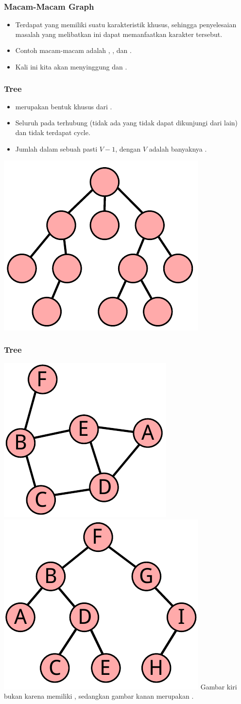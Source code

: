 \begin{frame}
\frametitle{Macam-Macam Graph}
\begin{itemize}
  \item Terdapat \fGraph yang memiliki suatu karakteristik khusus, sehingga penyelesaian masalah yang melibatkan \fgraph ini dapat memanfaatkan karakter tersebut.
  \item Contoh macam-macam \fgraph adalah , , dan .
  \item Kali ini kita akan menyinggung \fTree dan .
\end{itemize}
\end{frame}

\begin{frame}
\frametitle{Tree}
\begin{itemize}
  \item \fTree merupakan bentuk khusus dari \fgraph.
  \item Seluruh \fnode pada \ftree terhubung (tidak ada \fnode yang tidak dapat dikunjungi dari \fnode lain) dan tidak terdapat \alert{cycle}.
  \item Jumlah \fedge dalam sebuah \ftree pasti $V-1$, dengan $V$ adalah banyaknya \fnode.
\end{itemize}
\begin{center}
  \includegraphics[width=3.5 cm]{asset/plain.pdf}
\end{center}
\end{frame}

\begin{frame}
\frametitle{Tree}
\includegraphics[width=3.5 cm]{asset/not-tree.pdf}
\hspace{\fill}
\includegraphics[width=4 cm]{asset/tree.pdf}
\newline\newline
Gambar kiri bukan \ftree karena memiliki , sedangkan gambar kanan merupakan \ftree. 
\end{frame}

